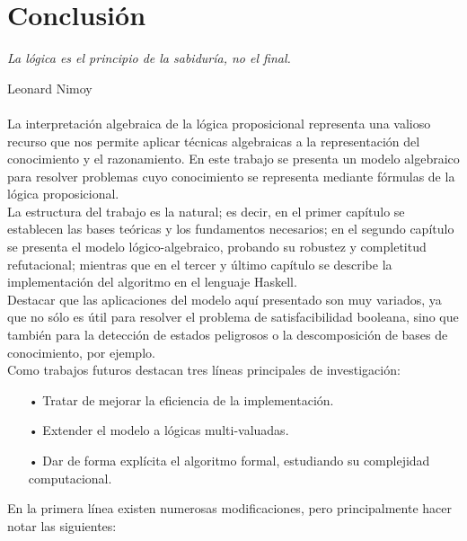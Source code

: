 \chapter*{Conclusión}

\hfil \textit{La lógica es el principio de la sabiduría, no el final.}

\hfil \hfil \hfil Leonard Nimoy \\\\

La interpretación algebraica de la lógica proposicional representa una valioso recurso que nos permite aplicar técnicas algebraicas a la representación del conocimiento y el razonamiento. En este trabajo se presenta un modelo algebraico para resolver problemas cuyo conocimiento se representa mediante fórmulas de la lógica proposicional.\\

La estructura del trabajo es la natural; es decir, en el primer capítulo se establecen las bases teóricas y los fundamentos necesarios; en el segundo capítulo se presenta el modelo lógico-algebraico, probando su robustez y completitud refutacional; mientras que en el tercer y último capítulo se describe la implementación del algoritmo en el lenguaje Haskell.\\

Destacar que las aplicaciones del modelo aquí presentado son muy variados, ya que no sólo es útil para resolver el problema de satisfacibilidad booleana, sino que también para la detección de estados peligrosos o la descomposición de bases de conocimiento, por ejemplo.\\

Como trabajos futuros destacan tres líneas principales de investigación:

\begin{itemize}
\item[•] Tratar de mejorar la eficiencia de la implementación.
\item[•] Extender el modelo a lógicas multi-valuadas.
\item[•] Dar de forma explícita el algoritmo formal, estudiando su complejidad computacional.
\end{itemize}

\newpage
En la primera línea existen numerosas modificaciones, pero principalmente hacer notar las siguientes:

